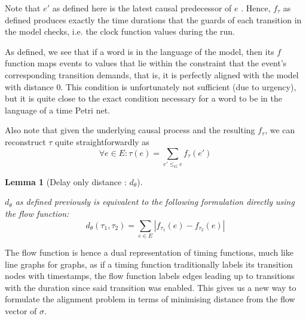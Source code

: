 \documentclass[conference]{IEEEtran}
\newtheorem{lemma}[theorem]{Lemma}
\begin{document}
	Note that $e'$ as defined here is the latest causal predecessor of $e$
	. 
	Hence, $f_\tau$ as defined produces exactly the time durations that the guards of each transition in the model checks, i.e. the clock function values during the run. 
	
	As defined, we see that if a word is in the language of the model, then its $f$ function maps events to values that lie within the constraint that the event's corresponding transition demands, that is, it is perfectly aligned with the model with distance 0. 
	This condition is unfortunately not sufficient (due to urgency), but it is quite close to the exact condition necessary for a word to be in the language of a time Petri net. 
	
	Also note that given the underlying causal process and the resulting $f_\tau$, we can reconstruct $\tau$ quite straightforwardly as $$\forall e \in E : \tau(e) = \sum_{e' \leq_G e} f_\tau(e')$$
	
	\begin{lemma}[Delay only distance : $d_\theta$]\label{manhattan2}
		
		$d_\theta$ as defined previously is equivalent to the following formulation directly using the flow function:
		$$d_\theta(\tau_1, \tau_2) = \sum_{e \in E}|f_{\tau_1}(e) - f_{\tau_2}(e)|$$
	\end{lemma}	
	
	The flow function is hence a dual representation of timing functions, much like line graphs for graphs, as if a timing function traditionally labels its transition nodes with timestamps, the flow function labels edges leading up to transitions with the duration since said transition was enabled. This gives us a new way to formulate the alignment problem in terms of minimising distance from the flow vector of $\sigma$. 
	
\end{document}
